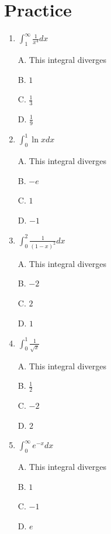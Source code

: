 \documentclass{article}
\begin{document}
\section{Practice}
\begin{enumerate}

    \item $\displaystyle \int_{1}^{\infty} \frac{1}{x^4}dx$
    
    A. This integral diverges

    B. $1$\

    C. $\displaystyle\frac{1}{3}$

    D. $\displaystyle \frac{1}{9}$
    \item $\displaystyle \int_{0}^{1} \ln x dx$
    
    A. This integral diverges

    B. $-e$

    C. $1$

    D. $-1$

    \item $\displaystyle \int_{0}^{2} \frac{1}{(1-x)^2}dx$
    
    A. This integral diverges

    B. $-2$

    C. $2$

    D. $1$

    \item $\displaystyle \int_{0}^{1} \frac{1}{\sqrt{x}}$
    
    A. This integral diverges

    B. $\displaystyle \frac{1}{2}$

    C. $-2$

    D. $2$

    \item $\displaystyle \int_{0}^{\infty} e^{-x}dx$
    
    A. This integral diverges

    B. $1$

    C. $-1$

    D. $e$
\end{enumerate}
\end{document}
